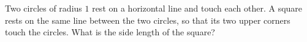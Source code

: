 Two circles of radius $1$ rest on a horizontal line and touch each other. A square rests on the same line between the two circles, so that its two upper corners touch the circles. What is the side length of the square?
